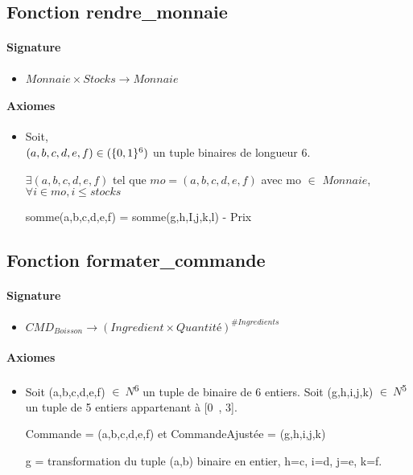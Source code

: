 \documentclass[]{article}
\begin{document}
\pagebreak

\subsection*{Fonction rendre\_monnaie}
\paragraph{Signature}
\begin{itemize}
\item
  $Monnaie \times Stocks \longrightarrow  Monnaie$
\end{itemize}
\paragraph{Axiomes}
\begin{itemize}
\item
  Soit, \\ $(a,b,c,d,e,f) \in(\{0,1\}\textsuperscript{6})$ un tuple binaires de longueur 6.

$\exists (a,b,c,d,e,f)$ tel que $mo = (a,b,c,d,e,f)$ avec mo $\in$ $Monnaie$,
$\forall i \in mo, i \leq stocks$

somme(a,b,c,d,e,f) = somme(g,h,I,j,k,l) - Prix
\end{itemize}

\subsection*{Fonction formater\_commande}
\paragraph{Signature}
\begin{itemize}
\item
  $CMD_{Boisson} \longrightarrow  (Ingredient \times Quantité)^{\#Ingredients}$
\end{itemize}
\paragraph{Axiomes}
\begin{itemize}
\item
 Soit (a,b,c,d,e,f) \(\in \ N\)\textsuperscript{6} un tuple de
  binaire de 6 entiers. Soit (g,h,i,j,k) \(\in \ N\)\textsuperscript{5}
  un tuple de 5 entiers appartenant à {[}0~, 3{]}.

Commande = (a,b,c,d,e,f) et CommandeAjustée = (g,h,i,j,k)

g = transformation du tuple (a,b) binaire en entier, h=c, i=d, j=e, k=f.
\end{itemize}
\end{document}
